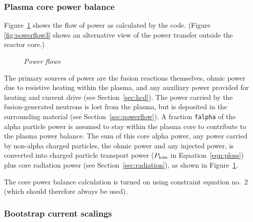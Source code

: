 \documentclass[11pt,a4paper]{report}
\begin{document}
\subsubsection{Plasma core power balance}
\label{sec:corepower}

Figure~\ref{fig:powerflow1} shows the flow of power as calculated by the code. (Figure~
\ref{fig:powerflow3} shows an alternative view of the power transfer outside the reactor core.)

\begin{figure}[tbph]
\caption[Power balance within the core plasma] {\label{fig:powerflow1}
  \textit{Power flows} }
\end{figure}

The primary sources of power are the fusion reactions themselves, ohmic power
due to resistive heating within the plasma, and any auxiliary power provided
for heating and current drive (see Section~\ref{sec:hcd}). The power carried
by the fusion-generated neutrons is lost from the plasma, but is deposited in
the surrounding material (see Section~\ref{sec:powerflow}). A fraction
\texttt{falpha} of the alpha particle power is assumed to stay within the
plasma core to contribute to the plasma power balance. The sum of this core
alpha power, any power carried by non-alpha charged particles, the ohmic power
and any injected power, is converted into charged particle transport power
($P_{\mbox{\scriptsize loss}}$ in Equation~\ref{eqn:ploss}) plus core
radiation power (see Section~\ref{sec:radiation}), as shown in
Figure~\ref{fig:powerflow1}. 

The core power balance calculation is turned on using constraint equation
no.\ 2 (which should therefore always be used).

\subsubsection{Bootstrap current scalings}
\label{sec:bootstrap}
\end{document}
